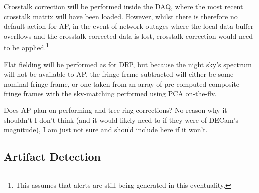 Crosstalk correction will be performed inside the DAQ, where the most recent crosstalk matrix will have been loaded. However, whilst there is therefore no default action for AP, in the event of network outages where the local data buffer overflows and the crosstalk-corrected data is lost, crosstalk correction would need to be applied.\footnote{ This assumes that alerts are still being generated in this eventuality.}

Flat fielding will be performed as for DRP, but because the \hyperref[sec:CPP:aux:nightSkySpectrum]{night sky's spectrum} will not be available to AP, the fringe frame subtracted will either be some nominal fringe frame, or one taken from an array of pre-computed composite fringe frames with the sky-matching performed using PCA on-the-fly.





\begin{note}
	Does AP plan on performing \bfeffect and tree-ring corrections? No reason why it shouldn't I don't think (and it would likely need to if they were of DECam's magnitude), I am just not sure and should include here if it won't.
\end{note}





\subsection{Artifact Detection}
\label{sec:acArtifactDetection}

